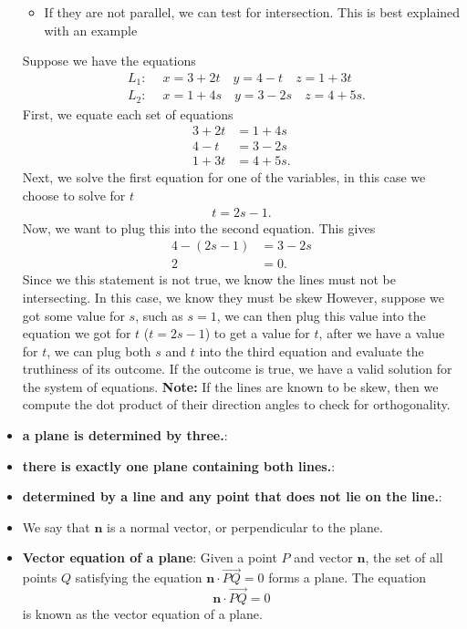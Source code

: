 \documentclass{report}
\begin{document}
\begin{itemize}
\begin{itemize}
                \item If they are not parallel, we can test for intersection. This is best explained with an example
            \end{itemize}
            Suppose we have the equations 
            \begin{align*}
                &L_{1}:\ \quad x= 3+2t \quad y= 4-t \quad z = 1+3t \\
                &L_{2}:\ \quad x= 1+4s \quad y= 3-2s \quad z=4+5s
            .\end{align*}
            First, we equate each set of equations 
            \begin{align*}
                3+2t &= 1+4s \\
                4-t&=3-2s \\
                1+3t&=4+5s
            .\end{align*}
            \bigbreak \noindent 
            Next, we solve the first equation for one of the variables, in this case we choose to solve for $t$
            \begin{align*}
                t = 2s-1
            .\end{align*}
            Now, we want to plug this into the second equation. This gives
            \begin{align*}
                4-(2s-1) &= 3-2s \\
                         2&=0
            .\end{align*}
            Since we this statement is not true, we know the lines must not be intersecting. In this case, we know they must be skew
            \bigbreak \noindent 
            However, suppose we got some value for $s$, such as $s=1$, we can then plug this value into the equation we got for $t$ ($t=2s-1$) to get a value for $t$, after we have a value for $t$, we can plug both $s$ and $t$ into the third equation and evaluate the truthiness of its outcome. If the outcome is true, we have a valid solution for the system of equations.
            \bigbreak \noindent 
            \textbf{Note:} If the lines are known to be skew, then we compute the dot product of their direction angles to check for orthogonality.
            \bigbreak \noindent 
        \item \textbf{a plane is determined by three.}:
        \item \textbf{there is exactly one plane containing both lines.}:
        \item \textbf{determined by a line and any point that does not lie on the line.}:
        \item We say that  $\mathbf{n}$ is a normal vector, or perpendicular to the plane.
        \item \textbf{Vector equation of a plane}:
            Given a point $P$ and vector $\mathbf{n}$, the set of all points $Q$ satisfying the equation $\mathbf{n} \cdot \overrightarrow{PQ} = 0$ forms a plane. The equation
            \[
                \mathbf{n} \cdot \overrightarrow{PQ} = 0
            \]
            is known as the vector equation of a plane.


\end{itemize}
\end{document}
